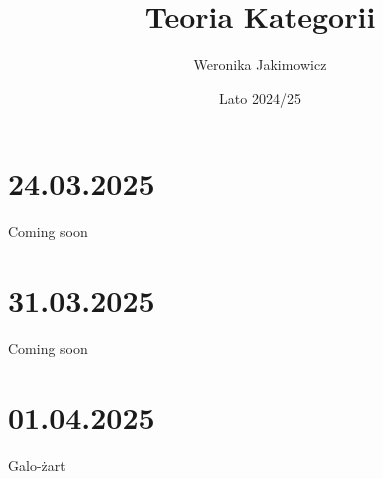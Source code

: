 \documentclass[twoside, a4paper, 12pt]{book}
\title{Teoria Kategorii}
\author{\color{subtext1}Weronika Jakimowicz}
\date{Lato 2024/25}
\begin{document}
\frontmatter 
\maketitle
\thispagestyle{empty}
\setcounter{page}{0}

\tableofcontents
\mainmatter

\pagestyle{fancy}











\section{24.03.2025}{Coming soon}
\section{31.03.2025}{Coming soon}
\section{01.04.2025}{Galo-żart}

% 
%
% 
%
% 
  
\end{document}
